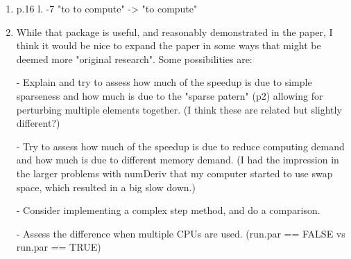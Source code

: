\documentclass{article}
\newenvironment{revQuote}{\itshape}{\vspace{\baselineskip}}
\newenvironment{response}{\normalfont}{\vspace{\baselineskip}}
\begin{document}
\begin{enumerate}
\begin{revQuote}
\begin{verbatim}
\end{verbatim}

  \end{revQuote}
  
  \begin{response}
    
  \end{response}

\item\begin{revQuote}

 p.16  l. -7 "to to compute" -> "to compute"


  \end{revQuote}
  
  \begin{response}
    
  \end{response}

\item\begin{revQuote}

While that package is useful, and reasonably demonstrated in the paper,
I think it would be nice to expand the paper in some ways that might be
deemed more "original research". Some possibilities are:

 - Explain and try to assess how much of the speedup is due to simple
sparseness and how much is due to the "sparse patern" (p2) allowing for
perturbing multiple elements together. (I think these are related but
slightly different?)
 
 - Try to assess how much of the speedup is due to reduce computing demand
and how much is due to different memory demand. (I had the impression in the
larger problems with numDeriv that my computer started to use swap space,
which resulted in a big slow down.)
 
 - Consider implementing a complex step method, and do a comparison.
 
 - Assess the difference when multiple CPUs are used. (run.par == FALSE vs
run.par == TRUE)

  \end{revQuote}
  
  \begin{response}
    
  \end{response}



  


\end{enumerate}
\end{document}
